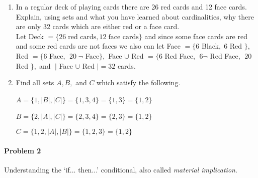 \documentclass[11pt, a4paper]{article}
\newcommand\setItemNumber[1]{\setcounter{enumi}{\numexpr#1-1\relax}}
\begin{document}
\begin{enumerate}
\begin{enumerate}
        \end{enumerate}

    \setItemNumber{26}
    \item In a regular deck of playing cards there are 26 red cards and 12 face cards. Explain, using sets and what you have learned about cardinalities, why there are only 32 cards which are either red or a face card.\\

        Let Deck $= \{ 26\;\text{red cards},12\;\text{face cards}\}$ and since some face cards are red and some red cards are not faces we also can let Face $= \{6$ Black$,\;6$ Red $\},$ Red $=\{6$ Face, $\;20\;\neg$ Face$\},$ Face $\cup$ Red $=\{6$ Red Face, $\;6\neg$ Red Face, $\;20$ Red $\},\;$and  $\;|$ Face $\cup$ Red $| = 32$ cards.

    \setItemNumber{30}
    \item Find all sets $A,B,$ and $C$ which satisfy the following.\
       
        \centering $A=\{1,|B|,|C|\} = \{1,3,4\} = \{1,3\} = \{1,2\}$\

        \centering $B=\{2,|A|,|C|\} = \{2,3,4\} = \{2,3\} = \{1,2\}$\

        \centering $C=\{1,2,|A|,|B|\} = \{1,2,3\} = \{1,2\}$


\end{enumerate}

\paragraph{Problem 2} Understanding the ‘if... then...’ conditional, also called {\it material implication}.

\end{document}

